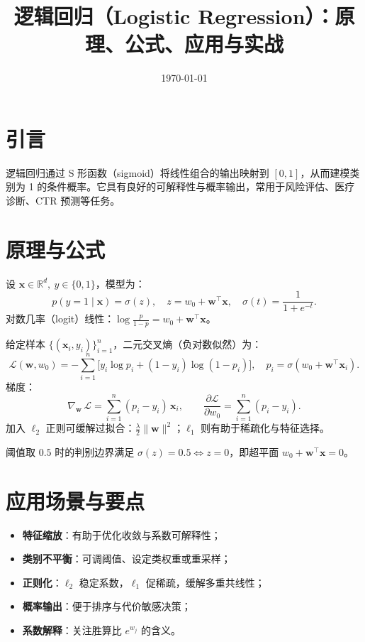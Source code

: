 \documentclass[UTF8,zihao=-4]{ctexart}
\title{逻辑回归（Logistic Regression）：原理、公式、应用与实战}
\author{}
\date{\today}
\begin{document}
\maketitle
\tableofcontents

\section{引言}
逻辑回归通过 S 形函数（sigmoid）将线性组合的输出映射到 $[0,1]$，从而建模类别为 1 的条件概率。它具有良好的可解释性与概率输出，常用于风险评估、医疗诊断、CTR 预测等任务。

\section{原理与公式}
设 $\bm{x}\in\mathbb{R}^d,\ y\in\{0,1\}$，模型为：
\begin{equation}
  p(y=1\mid \bm{x}) = \sigma(z),\quad z = w_0 + \bm{w}^\top \bm{x},\quad \sigma(t) = \frac{1}{1+e^{-t}}.
\end{equation}
对数几率（logit）线性：$\log \tfrac{p}{1-p} = w_0 + \bm{w}^\top \bm{x}$。

给定样本 $\{(\bm{x}_i,y_i)\}_{i=1}^n$，二元交叉熵（负对数似然）为：
\begin{equation}
  \mathcal{L}(\bm{w},w_0) = -\sum_{i=1}^n \big[y_i\log p_i + (1-y_i)\log (1-p_i)\big],\quad p_i=\sigma(w_0+\bm{w}^\top\bm{x}_i).
\end{equation}
梯度：
\begin{equation}
  \nabla_{\bm{w}}\,\mathcal{L} = \sum_{i=1}^n (p_i - y_i)\,\bm{x}_i,\qquad \frac{\partial\mathcal{L}}{\partial w_0} = \sum_{i=1}^n (p_i - y_i).
\end{equation}
加入 $\ell_2$ 正则可缓解过拟合：$\tfrac{\lambda}{2}\lVert\bm{w}\rVert^2$；$\ell_1$ 则有助于稀疏化与特征选择。

阈值取 $0.5$ 时的判别边界满足 $\sigma(z)=0.5\iff z=0$，即超平面 $w_0+\bm{w}^\top\bm{x}=0$。

\section{应用场景与要点}
\begin{itemize}
  \item \textbf{特征缩放}：有助于优化收敛与系数可解释性；
  \item \textbf{类别不平衡}：可调阈值、设定类权重或重采样；
  \item \textbf{正则化}：$\ell_2$ 稳定系数，$\ell_1$ 促稀疏，缓解多重共线性；
  \item \textbf{概率输出}：便于排序与代价敏感决策；
  \item \textbf{系数解释}：关注胜算比 $e^{w_j}$ 的含义。
\end{itemize}
\end{document}
